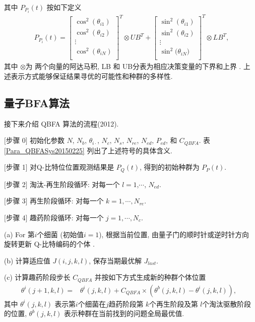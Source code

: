 其中 $P_{P_i}(t)$ 按如下定义
\begin{align*}
&P_{P_i}(t)=
\left [
\begin{array}{cccc}
\cos^2(\theta_{i1})\\ \cos^2(\theta_{i2})\\ \vdots\\ \cos^2(\theta_{iN})\\
\end{array}
\right]^T\otimes UB^T
+\left [
\begin{array}{cccc}
\sin^2(\theta_{i1})\\ \sin^2(\theta_{i2})\\ \vdots\\ \sin^2(\theta_{iN} \big)\\
\end{array}
\right]^T\otimes LB^T,
\end{align*}
其中 $\otimes$为 两个向量的阿达马积, LB 和 UB分表为相应决策变量的下界和上界 .
上述表示方式能够保证结果寻优的可能性和种群的多样性.
\subsection{量子BFA算法}
接下来介绍 QBFA 算法的流程(2012).

[步骤 0] 初始化参数 $N$, $N_b$, $\theta_{i\cdot}$, $N_c$, $N_s$, $N_{re}$, $N_{ed}$, $P_{ed}$, 和 $C_{QBFA}$.
表 \ref{Para_QBFASys20150225} 列出了上述符号的具体含义.

[步骤 1] 对Q-比特位位置观测结果是 $P_Q (t)$, 得到的初始种群为 $P_P(t)$.

[步骤 2] 淘汰-再生阶段循环: 对每一个 $l=1$,$\cdots$, $N_{ed}$.

[步骤 3] 再生阶段循环: 对每一个 $k=1,\cdots,N_{re}$.

[步骤 4] 趣药阶段循环:  对每一个 $j=1,\cdots,N_{c}$.

\quad\quad (a) \textcolor[rgb]{0,0,1}{For} 第$i$个细菌 (初始值$i=1$), 根据当前位置, 由量子门的顺时针或逆时针方向旋转更新 Q-比特编码的个体 .

\quad\quad (b) 计算适应值 $J(i,j,k,l)$, 保存当期最优解 $J_{last}$.

\quad\quad (c) 计算趣药阶段步长 $C_{QBFA}$ 并按如下方式生成新的种群个体位置
\begin{align}
    \theta^i(j+1,k,l)=&\theta^i(j,k,l)+C_{QBFA} \times(\theta^b(j,k,l)-\theta^i(j,k,l)),
\end{align}
其中 $\theta^i(j,k,l)$ 表示第$i$个细菌在$j$趋药阶段第 $k$个再生阶段及第 $l$个淘汰驱散阶段 的位置, $\theta^b(j,k,l)$ 表示种群在当前找到的问题全局最优值.

